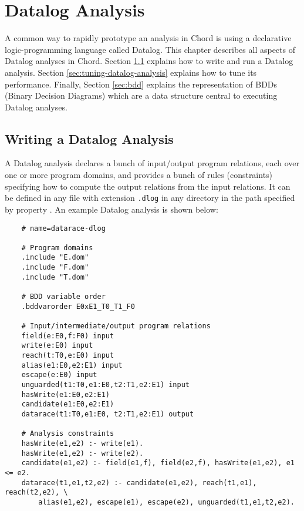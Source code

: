 \chapter{Datalog Analysis}
\label{chap:datalog-analysis}

A common way to rapidly prototype an analysis in Chord is using a declarative
logic-programming language called Datalog.  This chapter describes all aspects of
Datalog analyses in Chord.
Section \ref{sec:writing-datalog-analysis} explains how to write and run a Datalog analysis.
Section \ref{sec:tuning-datalog-analysis} explains how to tune its performance.
Finally, Section \ref{sec:bdd} explains the representation of BDDs (Binary Decision Diagrams)
which are a data structure central to executing Datalog analyses.

\section{Writing a Datalog Analysis}
\label{sec:writing-datalog-analysis}

A Datalog analysis declares a bunch of input/output program relations,
each over one or more program domains, and provides a bunch of rules (constraints)
specifying how to compute the output relations from the input relations.
It can be defined in any file with extension {\tt .dlog}
in any directory in the path specified by property .
An example Datalog analysis is shown below:

\texonly{\newpage}

\begin{framed}
{\small
\begin{verbatim}
    # name=datarace-dlog

    # Program domains
    .include "E.dom"
    .include "F.dom"
    .include "T.dom"

    # BDD variable order
    .bddvarorder E0xE1_T0_T1_F0

    # Input/intermediate/output program relations
    field(e:E0,f:F0) input
    write(e:E0) input
    reach(t:T0,e:E0) input
    alias(e1:E0,e2:E1) input
    escape(e:E0) input
    unguarded(t1:T0,e1:E0,t2:T1,e2:E1) input
    hasWrite(e1:E0,e2:E1)
    candidate(e1:E0,e2:E1) 
    datarace(t1:T0,e1:E0, t2:T1,e2:E1) output

    # Analysis constraints
    hasWrite(e1,e2) :- write(e1).
    hasWrite(e1,e2) :- write(e2).
    candidate(e1,e2) :- field(e1,f), field(e2,f), hasWrite(e1,e2), e1 <= e2.
    datarace(t1,e1,t2,e2) :- candidate(e1,e2), reach(t1,e1), reach(t2,e2), \
        alias(e1,e2), escape(e1), escape(e2), unguarded(t1,e1,t2,e2).
\end{verbatim}
}
\end{framed}

